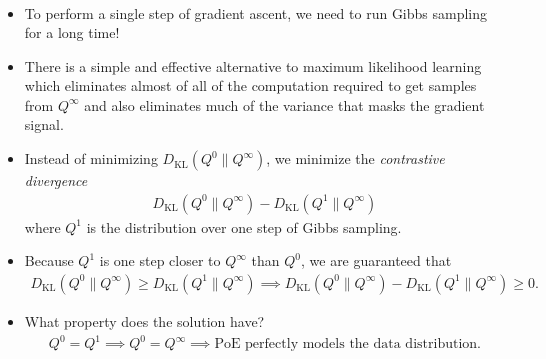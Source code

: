 \documentclass[10pt]{article}
\newcommand{\KL}{D_{\text{KL}}}
\begin{document}
\begin{itemize}
\begin{align}
\end{align}
\item To perform a single step of gradient ascent, we need to run Gibbs sampling for a long time!
\item There is a simple and effective alternative to maximum likelihood learning which eliminates almost of all of the computation required to get samples from $Q^\infty$ and also eliminates much of the variance that masks the gradient signal.
\item Instead of minimizing $\KL(Q^0\|Q^\infty)$, we minimize the \textit{contrastive divergence}
\begin{align*}
\KL(Q^0\|Q^\infty) - \KL(Q^1\|Q^\infty)
\end{align*}
where $Q^1$ is the distribution over one step of Gibbs sampling.
\item Because $Q^1$ is one step closer to $Q^\infty$ than $Q^0$, we are guaranteed that
\begin{align*}
\KL(Q^0 \| Q^\infty) \geq \KL(Q^1 \| Q^\infty) \implies \KL(Q^0\|Q^\infty) - \KL(Q^1\|Q^\infty) \geq 0.
\end{align*}
\item What property does the solution have?
\begin{align*}
Q^0 = Q^1 \implies Q^0 = Q^\infty \implies \text{PoE perfectly models the data distribution.}
\end{align*}
\end{itemize}

\newpage
\end{document}
